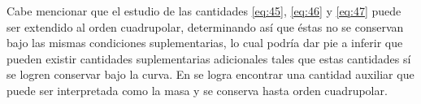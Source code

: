 Cabe mencionar que el estudio de las cantidades \eqref{eq:45}, \eqref{eq:46} y \eqref{eq:47} puede ser extendido al orden cuadrupolar, determinando así que éstas no se conservan bajo las mismas condiciones suplementarias, lo cual podría dar pie a inferir que pueden existir cantidades suplementarias adicionales tales que estas cantidades sí se logren conservar bajo la curva. En \cite{Steinhoff-Puetzfeld-2} se logra encontrar una cantidad auxiliar que puede ser interpretada como la masa y se conserva hasta orden cuadrupolar.